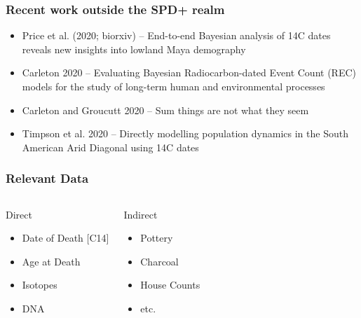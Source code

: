 \documentclass{beamer}
\begin{document}
\begin{frame}[c]
  \frametitle{Recent work outside the SPD+ realm}
    \begin{itemize}
      \item Price et al. (2020; biorxiv) -- End-to-end Bayesian analysis of 14C dates reveals new insights into lowland Maya demography
      \item Carleton 2020 -- Evaluating Bayesian Radiocarbon-dated Event Count (REC) models for the study of long-term human and environmental processes
      \item Carleton and Groucutt 2020 -- Sum things are not what they seem
      \item Timpson et al. 2020 -- Directly modelling population dynamics in the South American Arid Diagonal using 14C dates
  \end{itemize}
\end{frame}

\begin{frame}[t]
  \frametitle{Relevant Data}
  \begin{columns}[c]
     \begin{block}{Direct}
     \begin{itemize}
       \pause
       \item{Date of Death [C14]} 
       \pause
       \item{Age at Death} 
       \pause
       \item{Isotopes} 
       \pause
       \item{DNA} 
     \end{itemize}
     \end{block}
    \pause

     \begin{block}{Indirect}
     \begin{itemize}
       \pause
       \item{Pottery} 
       \pause
       \item{Charcoal} 
       \pause
       \item{House Counts} 
       \pause
       \item{etc.} 
     \end{itemize}
     \end{block}
  \end{columns}
\end{frame}
\end{document}
